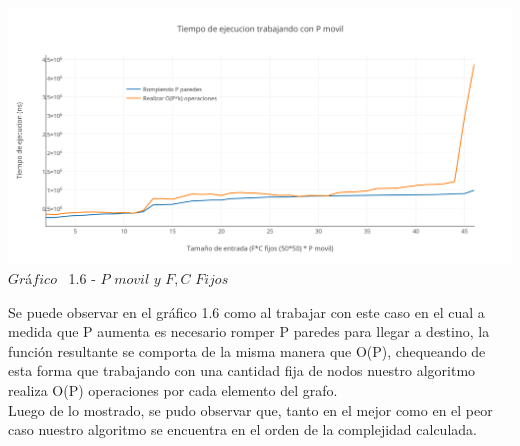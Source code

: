 \vspace*{0.3cm} \vspace*{0.3cm}
  \begin{center}
\includegraphics[scale=0.65]{./EJ1/pMovil.png}
{$Gr$\'a$fico$ \ 1.6 - $P$ $movil$ $y$ $F,C$ $Fijos$}
  \end{center}
  \vspace*{0.3cm}

Se puede observar en el gr\'afico 1.6 como al trabajar con este caso en el cual a medida que P aumenta es necesario romper P paredes para llegar a destino, la funci\'on resultante se comporta de la misma manera que O(P), chequeando de esta forma que trabajando con una cantidad fija de nodos nuestro algoritmo realiza O(P) operaciones por cada elemento del grafo.\\

Luego de lo mostrado, se pudo observar que, tanto en el mejor como en el peor caso nuestro algoritmo se encuentra en el orden de la complejidad calculada.